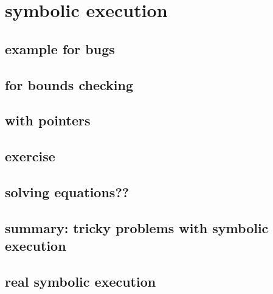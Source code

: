 \section{symbolic execution}



\subsection{example for bugs}


\subsection{for bounds checking}


\subsection{with pointers}


\subsection{exercise}


\subsection{solving equations??}

\subsection{summary: tricky problems with symbolic execution}


\subsection{real symbolic execution}


